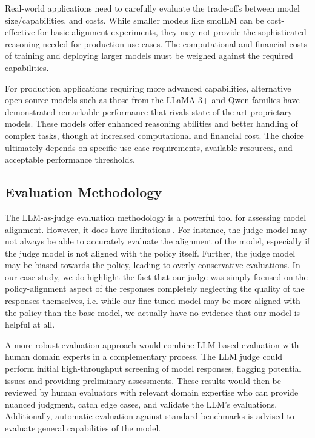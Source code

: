 Real-world applications need to carefully evaluate the trade-offs between model size/capabilities, and costs. While smaller models like smolLM can be cost-effective for basic alignment experiments, they may not provide the sophisticated reasoning needed for production use cases. The computational and financial costs of training and deploying larger models must be weighed against the required capabilities.

For production applications requiring more advanced capabilities, alternative open source models such as those from the LLaMA-3+  and Qwen  families have demonstrated remarkable performance that rivals state-of-the-art proprietary models. These models offer enhanced reasoning abilities and better handling of complex tasks, though at increased computational and financial cost. The choice ultimately depends on specific use case requirements, available resources, and acceptable performance thresholds.

\subsection{Evaluation Methodology}

The LLM-as-judge evaluation methodology is a powerful tool for assessing model alignment. However, it does have limitations . For instance, the judge model may not always be able to accurately evaluate the alignment of the model, especially if the judge model is not aligned with the policy itself. Further, the judge model may be biased towards the policy, leading to overly conservative evaluations. In our case study, we do highlight the fact that our judge was simply focused on the policy-alignment aspect of the responses completely neglecting the quality of the responses themselves, i.e. while our fine-tuned model may be more aligned with the policy than the base model, we actually have no evidence that our model is helpful at all.

A more robust evaluation approach would combine LLM-based evaluation with human domain experts in a complementary process. The LLM judge could perform initial high-throughput screening of model responses, flagging potential issues and providing preliminary assessments. These results would then be reviewed by human evaluators with relevant domain expertise who can provide nuanced judgment, catch edge cases, and validate the LLM's evaluations. Additionally, automatic evaluation against standard benchmarks is advised to evaluate general capabilities of the model.

